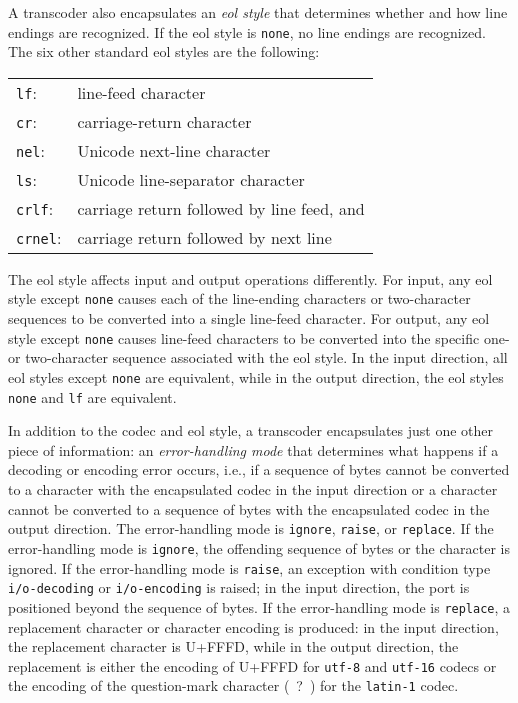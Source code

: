\label{io_s14}A transcoder also encapsulates an \textit{eol style} that determines
whether and how line endings are recognized.
If the eol style is \texttt{none}, no line endings are recognized.
The six other standard eol styles are the following:


{\footnotesize
\begin{tabular}[H]{ll}

\texttt{lf}:  &  line-feed character \\

\texttt{cr}:  &  carriage-return character \\

\texttt{nel}:  &  Unicode next-line character \\

\texttt{ls}:  &  Unicode line-separator character \\

\texttt{crlf}:  &  carriage return followed by line feed, and \\

\texttt{crnel}:  &  carriage return followed by next line
 \\
\end{tabular}
}



The eol style affects input and output operations differently.
For input, any eol style except \texttt{none} causes each of the
line-ending characters or two-character sequences to be converted
into a single line-feed character.
For output, any eol style except \texttt{none} causes line-feed
characters to be converted into the specific
one- or two-character sequence associated with the eol style.
In the input direction, all eol styles except \texttt{none} are
equivalent, while in the output direction, the eol styles
\texttt{none} and \texttt{lf} are equivalent.


\label{io_s15}In addition to the codec and eol style, a transcoder encapsulates just one
other piece of information:  an \textit{error-handling mode} that determines
what happens if a decoding or encoding error occurs, i.e., if a sequence
of bytes cannot be converted to a character with the encapsulated codec in the
input direction or a character cannot be converted to a sequence of bytes
with the encapsulated codec in the output direction.
The error-handling mode is \texttt{ignore}, \texttt{raise}, or
\texttt{replace}.
If the error-handling mode is \texttt{ignore}, the offending sequence of
bytes or the character is ignored.
If the error-handling mode is \texttt{raise}, an exception with condition
type \texttt{i/o-decoding} or \texttt{i/o-encoding} is raised; in the
input direction, the port is positioned beyond the sequence of bytes.
If the error-handling mode is \texttt{replace}, a replacement character
or character encoding is produced: in the input direction, the replacement
character is U+FFFD, while in the output direction, the replacement is
either the encoding of U+FFFD for \texttt{utf-8} and \texttt{utf-16}
codecs or the encoding of the question-mark character ( ? ) for the
\texttt{latin-1} codec.


